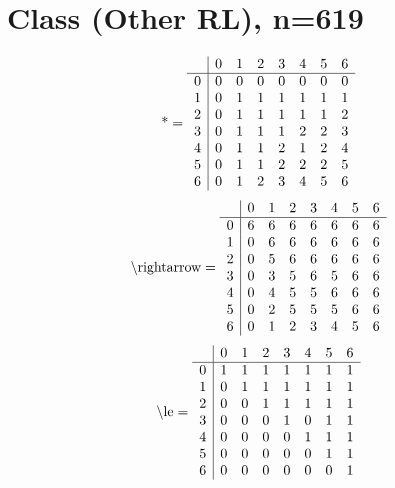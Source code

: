 \documentclass[11pt]{article}
\begin{document}
\section{Class (Other RL), n=619}
\[\text{*} = 
\begin{array}{r | r r r r r r r}
 & 0 & 1 & 2 & 3 & 4 & 5 & 6 \\ \hline
0 & 0 & 0 & 0 & 0 & 0 & 0 & 0 \\
1 & 0 & 1 & 1 & 1 & 1 & 1 & 1 \\
2 & 0 & 1 & 1 & 1 & 1 & 1 & 2 \\
3 & 0 & 1 & 1 & 1 & 2 & 2 & 3 \\
4 & 0 & 1 & 1 & 2 & 1 & 2 & 4 \\
5 & 0 & 1 & 1 & 2 & 2 & 2 & 5 \\
6 & 0 & 1 & 2 & 3 & 4 & 5 & 6 \\
\end{array}
\]
\[\text{\textbackslash rightarrow} = 
\begin{array}{r | r r r r r r r}
 & 0 & 1 & 2 & 3 & 4 & 5 & 6 \\ \hline
0 & 6 & 6 & 6 & 6 & 6 & 6 & 6 \\
1 & 0 & 6 & 6 & 6 & 6 & 6 & 6 \\
2 & 0 & 5 & 6 & 6 & 6 & 6 & 6 \\
3 & 0 & 3 & 5 & 6 & 5 & 6 & 6 \\
4 & 0 & 4 & 5 & 5 & 6 & 6 & 6 \\
5 & 0 & 2 & 5 & 5 & 5 & 6 & 6 \\
6 & 0 & 1 & 2 & 3 & 4 & 5 & 6 \\
\end{array}
\]
\[\text{\textbackslash le} = 
\begin{array}{r | r r r r r r r}
 & 0 & 1 & 2 & 3 & 4 & 5 & 6 \\ \hline
0 & 1 & 1 & 1 & 1 & 1 & 1 & 1 \\
1 & 0 & 1 & 1 & 1 & 1 & 1 & 1 \\
2 & 0 & 0 & 1 & 1 & 1 & 1 & 1 \\
3 & 0 & 0 & 0 & 1 & 0 & 1 & 1 \\
4 & 0 & 0 & 0 & 0 & 1 & 1 & 1 \\
5 & 0 & 0 & 0 & 0 & 0 & 1 & 1 \\
6 & 0 & 0 & 0 & 0 & 0 & 0 & 1 \\
\end{array}
\]
\end{document}
